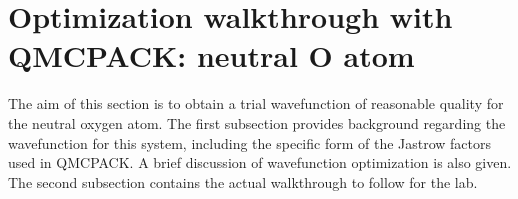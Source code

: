\section{Optimization walkthrough with QMCPACK: neutral O atom}\label{sec:optimization_walkthrough}
The aim of this section is to obtain a trial wavefunction of reasonable quality 
for the neutral oxygen atom.  The first subsection provides background regarding 
the wavefunction for this system, including the specific form of the Jastrow 
factors used in QMCPACK.  A brief discussion of wavefunction optimization is 
also given.  The second subsection contains the actual walkthrough to follow 
for the lab. 


